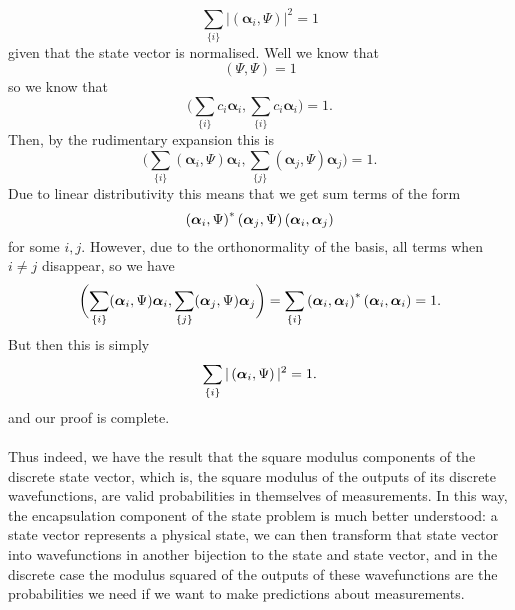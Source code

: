 $$
\sum_{\{i\}}|(\bm{\alpha}_{i},\Psi)|^2=1
$$
given that the state vector is normalised. Well we know that 
$$
(\Psi,\Psi)=1
$$
so we know that 
$$
\biggl(\sum_{\{i\}}c_{i}\bm{\alpha}_{i},\sum_{\{i\}}c_{i}\bm{\alpha}_{i}\biggr)=1.
$$
Then, by the rudimentary expansion this is 
$$
\biggl(\sum_{\{i\}}(\bm{\alpha}_{i},\Psi)\bm{\alpha}_{i},\sum_{\{j\}}(\bm{\alpha}_{j},\Psi)\bm{\alpha}_{j}\biggr)=1.
$$
Due to linear distributivity this means that we get sum terms of the form
$$
\left(\bm{\alpha}_{i},\Psi\right)^{\ast}\left(\bm{\alpha}_{j},\Psi\right)\left(\bm{\alpha}_{i},\bm{\alpha}_{j}\right)
$$
for some $i,j$. However, due to the orthonormality of the basis, all terms when $i\neq j$ disappear, so we have 
$$
\biggl(\sum_{\{i\}}(\bm{\alpha}_{i},\Psi)\bm{\alpha}_{i},\sum_{\{j\}}(\bm{\alpha}_{j},\Psi)\bm{\alpha}_{j}\biggr)=\sum_{\{i\}}\left(\bm{\alpha}_{i},\bm{\alpha}_{i}\right)^{\ast}\left(\bm{\alpha}_{i},\bm{\alpha}_{i}\right)=1.
$$
But then this is simply
$$
\sum_{\{i\}}|\left(\bm{\alpha}_{i},\Psi\right)|^2=1.
$$
and our proof is complete.
\\\\
Thus indeed, we have the result that the square modulus components of the discrete state vector, which is, the square modulus of the outputs of its discrete wavefunctions, are valid probabilities in themselves of measurements. In this way, the encapsulation component of the state problem is much better understood: a state vector represents a physical state, we can then transform that state vector into wavefunctions in another bijection to the state and state vector, and in the discrete case the modulus squared of the outputs of these wavefunctions are the probabilities we need if we want to make predictions about measurements.
